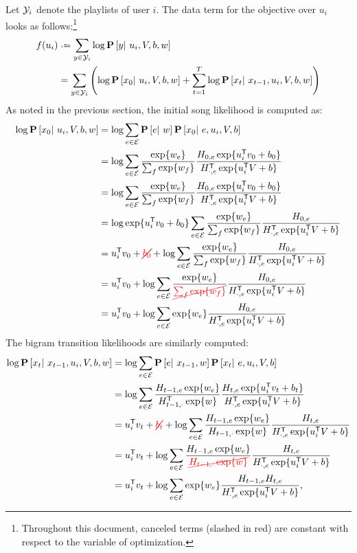 \documentclass{article}
\newcommand{\ccancel}[2][black]{\color{#1}\cancel{#2}\normalcolor}
\def\E{\ensuremath{\mathcal{E}}}
\begin{document}
Let $\mathcal{Y}_i$ denote the playlists of user $i$. The data term for the objective over $u_i$ looks as follows:\footnote{Throughout this document, canceled terms (slashed in red) are 
constant with respect to the variable of optimization.}
\begin{align}
f(u_i) &\defeq \sum_{y \in \Y_i} \log\P\left[y\given u_i, V, b, w\right]\notag\\
&= \sum_{y \in \Y_i}\left( \log \P\left[x_0 \given u_i, V, b, w \right] + \sum_{t=1}^T \log \P\left[x_t \given x_{t-1}, u_i, V, b, w \right] \right)\label{eq:ustep:obj}
\end{align}
As noted in the previous section, the initial song likelihood is computed as:
\begin{align}
\log\P\left[x_0 \given u_i, V, b, w\right] &= \log\sum_{e\in \E} \P\left[e\given w\right]\P\left[x_0 \given e, u_i, V, b \right] \notag\\
&= \log\sum_{e\in \E} \frac{\exp\{ w_e\}}{\sum_f \exp\{w_f\}} \frac{H_{0, e} \exp\{u_i\trans v_0 + b_0 \} }{H_{\cdot, e}\trans \exp\{u_i\trans V + b \} }\notag\\
&= \log\sum_{e\in \E} \frac{\exp\{ w_e\}}{\sum_{f} \exp\{w_f\}} \frac{H_{0, e} \exp\{u_i\trans v_0 + b_0 \} }{H_{\cdot, e}\trans \exp\{u_i\trans V + b \} }\notag\\
&= \log \exp\{u_i\trans v_0 + b_0 \} \sum_{e \in \E} \frac{\exp\{ w_e \}}{\sum_f \exp\{w_f\}}\frac{ H_{0, e} }{H_{\cdot, e}\trans \exp\{u_i\trans V + b \} }\notag\\
&= u_i\trans v_0 + \ccancel[red]{b_0} + \log \sum_{e\in \E}\frac{\exp\{w_e\}}{\sum_f \exp\{w_f\}}\frac{ H_{0, e}}{H_{\cdot, e}\trans \exp\{u_i\trans V + b \}}\notag\\
&= u_i\trans v_0 + \log \sum_{e\in \E}\frac{\exp\{w_e\}}{\ccancel[red]{\sum_f \exp\{w_f\}}}\frac{ H_{0, e}}{H_{\cdot, e}\trans \exp\{u_i\trans V + b \}}\notag\\%
&= u_i\trans v_0 + \log \sum_{e\in \E}\exp\{w_e\}\frac{ H_{0, e}}{H_{\cdot, e}\trans \exp\{u_i\trans V + b \}}\label{eq:ustep:initial}
\end{align}
The bigram transition likelihoods are similarly computed:
\begin{align}
\log\P\left[x_t \given x_{t-1}, u_i, V, b, w\right] &= \log\sum_{e\in \E} \P\left[e \given x_{t-1}, w \right]\P\left[x_t \given e, u_i, V, b \right]\notag\\
&= \log\sum_{e\in \E} \frac{H_{t-1,e} \exp\{w_e\} }{H_{t-1,\cdot}\trans \exp\{w\}} \frac{H_{t,e} \exp\{u_i\trans v_t + b_t \} }{H_{\cdot,e}\trans \exp\{u_i\trans V + b \} }\notag\\
&= u_i\trans v_t + \ccancel[red]{b_t} + \log\sum_{e\in \E} \frac{H_{t-1,e}\exp\{w_e\} }{H_{t-1,\cdot}\exp\{w\}}\frac{H_{t, e}}{H_{\cdot,e}\trans \exp\{u_i\trans V + b \} }\notag\\
&= u_i\trans v_t + \log\sum_{e\in \E} \frac{H_{t-1,e} \exp\{w_e\}}{\ccancel[red]{H_{t-1,\cdot} \exp\{w\} }}\frac{ H_{t,e} }{H_{\cdot,e}\trans \exp\{u_i\trans V + b \} }\notag\\
&= u_i\trans v_t + \log\sum_{e\in \E} \exp\{w_e\} \frac{H_{t-1,e} H_{t,e} }{H_{\cdot,e}\trans \exp\{u_i\trans V + b \} },\label{eq:ustep:bigram}
\end{align}
\end{document}
